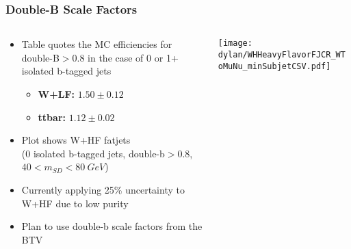 \documentclass{beamer}
\begin{document}
\begin{frame}
  \frametitle{Double-B Scale Factors}
  \begin{columns}
    \begin{column}{0.5\linewidth}
      \begin{itemize}
      \item Table quotes the MC efficiencies for
        double-B$> 0.8$ in the case of 0 or 1+ isolated b-tagged jets
        \begin{itemize}
        \item {\bf W+LF:} $1.50 \pm 0.12$
        \item {\bf ttbar:} $1.12 \pm 0.02$
        \end{itemize}
      \item Plot shows W+HF fatjets \\
        (0 isolated b-tagged jets, double-b$> 0.8$, $40 < m_{SD} < \SI{80}{GeV}$)
      \item Currently applying 25\% uncertainty to W+HF due to low purity
      \item Plan to use double-b scale factors from the BTV
      \end{itemize}
    \end{column}
    \begin{column}{0.7\linewidth}
      {\footnotesize
        
      }
      \texttt{[image: dylan/WHHeavyFlavorFJCR\_WToMuNu\_minSubjetCSV.pdf]}
    \end{column}
  \end{columns}
\end{frame}
\end{document}
